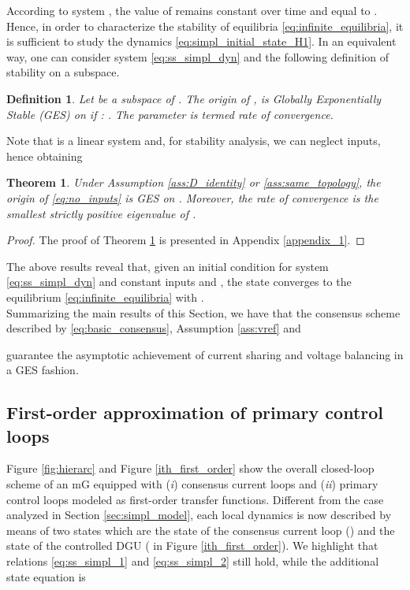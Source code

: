 \documentclass[a4paper]{article}
\theoremstyle{plain}
\newtheorem{theorem}{Theorem}
\newtheorem{definition}{Definition}
\begin{document}
According to system , the value of  remains constant over time and equal to . Hence, in order to characterize the stability of equilibria \eqref{eq:infinite_equilibria}, it is sufficient to study the dynamics \eqref{eq:simpl_initial_state_H1}. In an equivalent way, one can consider system \eqref{eq:ss_simpl_dyn} and the following definition of stability on a subspace.
\begin{definition}
	Let  be a subspace of . The origin of ,  is Globally Exponentially Stable (GES) on  if  : . The parameter  is termed \textit{rate of convergence}.
\end{definition}

Note that  is a linear system and, for stability analysis, we can neglect inputs, hence obtaining 

\begin{theorem}
	\label{thm:GES_H1}
	Under Assumption \ref{ass:D_identity} or \ref{ass:same_topology}, the origin of \eqref{eq:no_inputs} is GES on . Moreover, the rate of convergence is the smallest strictly positive eigenvalue of .
\end{theorem}
\begin{proof}
	The proof of Theorem \ref{thm:GES_H1} is presented in Appendix \ref{appendix_1}.
\end{proof}
The above results reveal that, given an initial
condition  for system \eqref{eq:ss_simpl_dyn}
and constant inputs  and
, the state 
converges to the equilibrium \eqref{eq:infinite_equilibria} with .\\
Summarizing the main results of this Section, we have that the consensus scheme described by \eqref{eq:basic_consensus}, Assumption \ref{ass:vref} and 

guarantee the asymptotic achievement of current sharing and voltage balancing in a GES fashion. 


\subsection{First-order approximation of primary control loops}
\label{sec:fo_approx}
Figure \ref{fig:hierarc} and Figure \ref{ith_first_order} show the overall
closed-loop scheme of an mG equipped with (\textit{i}) consensus current loops
and (\textit{ii}) primary control loops modeled as first-order transfer
functions. Different from the case analyzed in Section
\ref{sec:simpl_model}, each local dynamics is now described by means
of two states which are the state of the consensus current loop
() and the state of the controlled DGU ( in Figure
\ref{ith_first_order}). We highlight that relations
\eqref{eq:ss_simpl_1} and \eqref{eq:ss_simpl_2} still hold, while the additional state equation is
\end{document}
